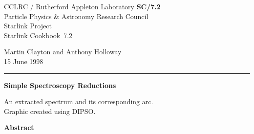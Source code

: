 \documentclass[twoside,11pt]{article}
\newcommand{\stardoccategory}  {Starlink Cookbook}
\newcommand{\stardocinitials}  {SC}
\newcommand{\stardocnumber}    {7.2}
\newcommand{\stardocauthors}   {Martin Clayton and Anthony Holloway}
\newcommand{\stardocdate}      {15 June 1998}
\newcommand{\stardoctitle}     {Simple Spectroscopy Reductions}
\newcommand{\stardocname}{\stardocinitials /\stardocnumber}
\newenvironment{latexonly}{}{}
\begin{document}
\thispagestyle{empty}

\begin{latexonly}
   CCLRC / {\sc Rutherford Appleton Laboratory} \hfill {\bf \stardocname}\\
   {\large Particle Physics \& Astronomy Research Council}\\
   {\large Starlink Project\\}
   {\large \stardoccategory\ \stardocnumber}
   \begin{flushright}
   \stardocauthors\\
   \stardocdate
   \end{flushright}
   \vspace{-4mm}
   \rule{\textwidth}{0.5mm}
   \vspace{5mm}
   \begin{center}
   {\Huge\bf  \stardoctitle \\ [2.5ex]}
   \end{center}
   \vspace{-5mm}

   \begin{center}
   \leavevmode\epsfysize=100mm

   An extracted spectrum and its corresponding arc.\\
   Graphic created using DIPSO\cite{dipso}\@.
   \end{center}

   \vspace{10mm}
   \begin{center}
      {\Large\bf Abstract}
   \end{center}
\end{latexonly}
\end{document}
